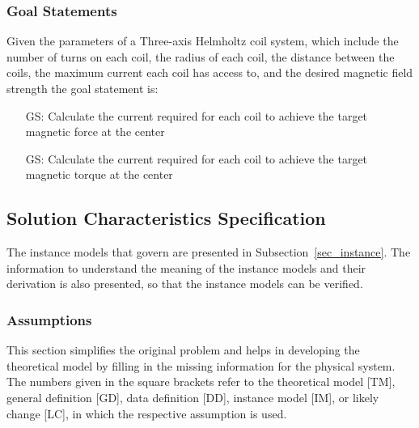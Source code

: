 \documentclass[12pt]{article}
\newcounter{goalnum} %
\begin{document}
\subsubsection{Goal Statements}

Given the parameters of a Three-axis Helmholtz coil system, which include the number of turns on each coil, the radius of each coil, the distance between the coils, the maximum current each coil has access to, and the desired magnetic field strength the goal statement is:

\begin{itemize}

\item[GS\refstepcounter{goalnum}\thegoalnum \label{G_force}:] Calculate the current required for each coil to achieve the target magnetic force at the center
\item[GS\refstepcounter{goalnum}\thegoalnum \label{G_torque}:] Calculate the current required for each coil to achieve the target magnetic torque at the center

\end{itemize}

\subsection{Solution Characteristics Specification}


The instance models that govern \progname{} are presented in
Subsection~\ref{sec_instance}.  The information to understand the meaning of the
instance models and their derivation is also presented, so that the instance
models can be verified.

\subsubsection{Assumptions} \label{sec_assumpt}
This section simplifies the original problem and helps in developing the
theoretical model by filling in the missing information for the physical system.
The numbers given in the square brackets refer to the theoretical model [TM],
general definition [GD], data definition [DD], instance model [IM], or likely
change [LC], in which the respective assumption is used.
\end{document}
